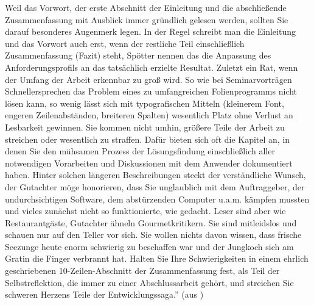 Weil das Vorwort, der erste Abschnitt der Einleitung und die abschließende Zusammenfassung mit Ausblick immer gründlich gelesen werden, sollten Sie darauf besonderes Augenmerk
legen. In der Regel schreibt man die Einleitung und das Vorwort auch erst, wenn der restliche
Teil einschließlich Zusammenfassung (Fazit) steht, Spötter nennen das die Anpassung des
Anforderungsprofils an das tatsächlich erzielte Resultat.
Zuletzt ein Rat, wenn der Umfang der Arbeit erkennbar zu groß wird. So wie bei Seminarvorträgen Schnellersprechen das Problem eines zu umfangreichen Folienprogramms nicht
lösen kann, so wenig lässt sich mit typografischen Mitteln (kleinerem Font, engeren Zeilenabständen, breiteren Spalten) wesentlich Platz ohne Verlust an Lesbarkeit gewinnen. Sie kommen
nicht umhin, größere Teile der Arbeit zu streichen oder wesentlich zu straffen.
Dafür bieten sich oft die Kapitel an, in denen Sie den mühsamen Prozess der Lösungsfindung
einschließlich aller notwendigen Vorarbeiten und Diskussionen mit dem Anwender dokumentiert haben. Hinter solchen längeren Beschreibungen steckt der verständliche Wunsch, der Gutachter möge honorieren, dass Sie unglaublich mit dem Auftraggeber, der undurchsichtigen
Software, dem abstürzenden Computer u.a.m. kämpfen mussten und vieles zunächst nicht so
funktionierte, wie gedacht.
Leser sind aber wie Restaurantgäste, Gutachter ähneln Gourmetkritikern. Sie sind mitleidslos und schauen nur auf den Teller vor sich. Sie wollen nichts davon wissen, dass frische Seezunge heute enorm schwierig zu beschaffen war und der Jungkoch sich am Gratin die Finger
verbrannt hat. Halten Sie Ihre Schwierigkeiten in einem ehrlich geschriebenen 10-Zeilen-Abschnitt der Zusammenfassung fest, als Teil der Selbstreflektion, die immer zu einer
Abschlussarbeit gehört, und streichen Sie schweren Herzens Teile der Entwicklungssaga.'' (aus \cite{Wegner_engl16})

